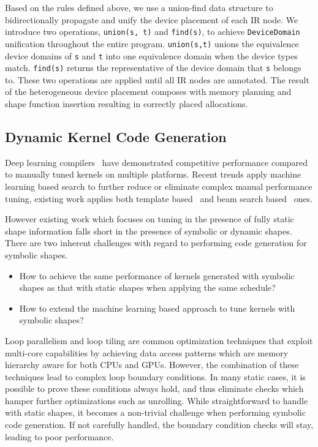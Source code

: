 Based on the rules defined above, we use a union-find data structure to bidirectionally
  propagate and unify the device placement of each IR node.
We introduce two operations, \texttt{union(s, t)} and \texttt{find(s)},
  to achieve \texttt{DeviceDomain} unification throughout the entire program.
\texttt{union(s,t)} unions the equivalence device domains of \texttt{s} and \texttt{t}
  into one equivalence domain when the device types match.
\texttt{find(s)} returns the representative of the device domain
  that \texttt{s} belongs to.
These two operations are applied until all IR nodes are annotated.
The result of the heterogeneous device placement composes with memory planning
  and shape function insertion resulting in correctly placed allocations.

\subsection{Dynamic Kernel Code Generation}
\label{sec:compliation:codegen}

Deep learning compilers~\citep{tvm_osdi18, halide} have demonstrated competitive performance
  compared to manually tuned kernels on multiple platforms.
Recent trends apply machine learning based search to further reduce or eliminate complex manual performance tuning,
  existing work applies both template based~\citep{chen2018learning, zheng2020flextensor} and beam search based~\citep{adams2019learning} ones.

However existing work which focuses on tuning in the presence of fully static shape information falls short
  in the presence of symbolic or dynamic shapes.
There are two inherent challenges with regard to performing code generation for symbolic shapes.
\begin{itemize}
    \item How to achieve the same performance of kernels generated with symbolic shapes as
          that with static shapes when applying the same schedule?
    \item How to extend the machine learning based approach to tune kernels with symbolic shapes?
\end{itemize}

Loop parallelism and loop tiling are common optimization techniques that exploit multi-core capabilities
  by achieving data access patterns which are memory hierarchy aware for both CPUs and GPUs.
However, the combination of these techniques lead to complex loop boundary conditions.
In many static cases, it is possible to prove these conditions always hold,
  and thus eliminate checks which hamper further optimizations such as unrolling.
While straightforward to handle with static shapes, it becomes a non-trivial challenge when performing symbolic code generation.
If not carefully handled, the boundary condition checks will stay, leading to poor performance.

